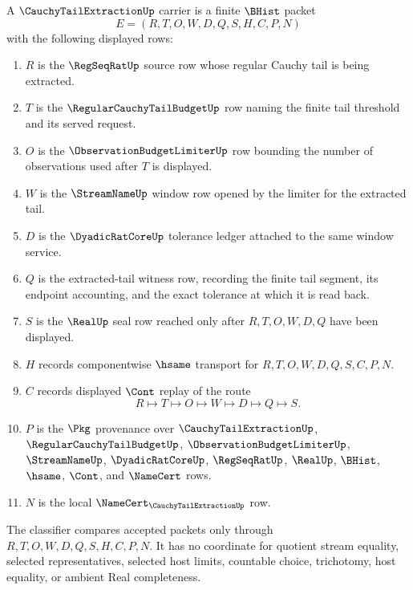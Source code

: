 \begin{definition}
\label{def:cauchy-tail-extraction-carrier}
A $\CauchyTailExtractionUp$ carrier is a finite $\BHist$ packet
$$
E=(R,T,O,W,D,Q,S,H,C,P,N)
$$
with the following displayed rows:
\begin{enumerate}
\item $R$ is the $\RegSeqRatUp$ source row whose regular Cauchy tail is being extracted.
\item $T$ is the $\RegularCauchyTailBudgetUp$ row naming the finite tail threshold and its served request.
\item $O$ is the $\ObservationBudgetLimiterUp$ row bounding the number of observations used after $T$ is displayed.
\item $W$ is the $\StreamNameUp$ window row opened by the limiter for the extracted tail.
\item $D$ is the $\DyadicRatCoreUp$ tolerance ledger attached to the same window service.
\item $Q$ is the extracted-tail witness row, recording the finite tail segment, its endpoint accounting, and the exact tolerance at which it is read back.
\item $S$ is the $\RealUp$ seal row reached only after $R,T,O,W,D,Q$ have been displayed.
\item $H$ records componentwise $\hsame$ transport for $R,T,O,W,D,Q,S,C,P,N$.
\item $C$ records displayed $\Cont$ replay of the route
$$
R \longmapsto T \longmapsto O \longmapsto W \longmapsto D \longmapsto Q \longmapsto S .
$$
\item $P$ is the $\Pkg$ provenance over $\CauchyTailExtractionUp$, $\RegularCauchyTailBudgetUp$, $\ObservationBudgetLimiterUp$, $\StreamNameUp$, $\DyadicRatCoreUp$, $\RegSeqRatUp$, $\RealUp$, $\BHist$, $\hsame$, $\Cont$, and $\NameCert$ rows.
\item $N$ is the local $\NameCert_{\CauchyTailExtractionUp}$ row.
\end{enumerate}
The classifier compares accepted packets only through $R,T,O,W,D,Q,S,H,C,P,N$. It has no coordinate for quotient stream equality, selected representatives, selected host limits, countable choice, trichotomy, host equality, or ambient Real completeness.
\end{definition}

